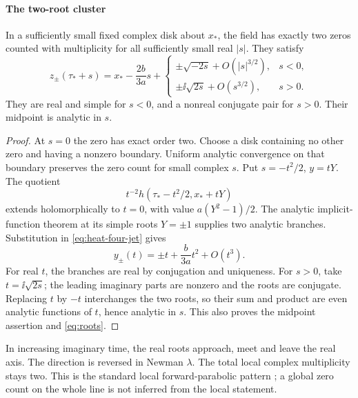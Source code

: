 \paragraph{The two-root cluster}
\begin{theorem}\label{thm:splitting}
In a sufficiently small fixed complex disk about \(x_*\), the field
has exactly two zeros counted with multiplicity for all sufficiently
small real \(|s|\). They satisfy
\begin{equation}\label{eq:roots}
 z_\pm(\tau_*+s)=x_*-\frac{2b}{3a}s+
 \begin{cases}
  \displaystyle\pm\sqrt{-2s}+O(|s|^{3/2}),&s<0,\\[2pt]
  \displaystyle\pm\ii\sqrt{2s}+O(s^{3/2}),&s>0.
 \end{cases}
\end{equation}
They are real and simple for \(s<0\), and a nonreal conjugate pair for
\(s>0\). Their midpoint is analytic in \(s\).
\end{theorem}
\begin{proof}
At \(s=0\) the zero has exact order two. Choose a disk containing no
other zero and having a nonzero boundary. Uniform analytic convergence
on that boundary preserves the zero count for small complex \(s\).
Put \(s=-t^2/2\), \(y=tY\). The quotient
\[
 t^{-2}h(\tau_*-t^2/2,x_*+tY)
\]
extends holomorphically to \(t=0\), with value
\(a(Y^2-1)/2\). The analytic implicit-function theorem at its simple
roots \(Y=\pm1\) supplies two analytic branches. Substitution in
\eqref{eq:heat-four-jet} gives
\begin{equation}\label{eq:t-roots}
 y_\pm(t)=\pm t+\frac{b}{3a}t^2+O(t^3).
\end{equation}
For real \(t\), the branches are real by conjugation and uniqueness.
For \(s>0\), take \(t=\ii\sqrt{2s}\); the leading imaginary parts are
nonzero and the roots are conjugate. Replacing \(t\) by \(-t\)
interchanges the two roots, so their sum and product are even analytic
functions of \(t\), hence analytic in \(s\). This also proves the
midpoint assertion and \eqref{eq:roots}.
\end{proof}

In increasing imaginary time, the real roots approach, meet and leave
the real axis. The direction is reversed in Newman \(\lambda\).
The total local complex multiplicity stays two. This is the standard
local forward-parabolic pattern \cite{Angenent1991}; a global zero count
on the whole line is not inferred from the local statement.



